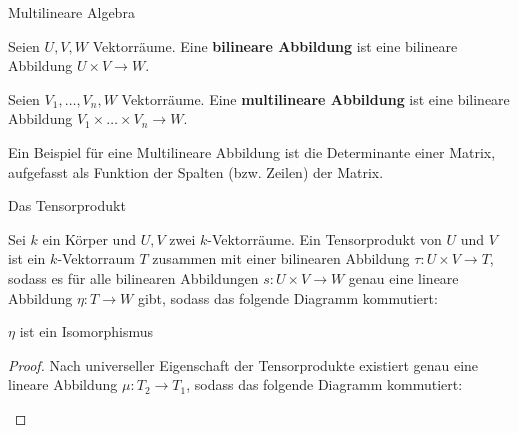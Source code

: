 \documentclass{report}
\newcommand{\tbf}[1]{\textbf{#1}}
\begin{document}
\begin{chapter}{Multilineare Algebra}
\begin{definition}
 Seien $U, V, W$ Vektorräume. Eine \tbf{bilineare Abbildung} ist eine bilineare Abbildung $U \times V \to W$.
\end{definition}
\begin{definition}
 Seien $V_1, \hdots, V_n, W$ Vektorräume. Eine \tbf{multilineare Abbildung} ist eine bilineare Abbildung $V_1 \times \hdots \times V_n \to W$.
\end{definition}
\noindent Ein Beispiel für eine Multilineare Abbildung ist die Determinante einer Matrix, aufgefasst als Funktion der Spalten (bzw. Zeilen) der Matrix.
\begin{section}{Das Tensorprodukt}
\begin{definition}
 Sei $k$ ein Körper und $U, V$ zwei $k$-Vektorräume. Ein Tensorprodukt von $U$ und $V$ ist ein $k$-Vektorraum $T$ zusammen mit einer bilinearen Abbildung $\tau : U \times V \to T$, sodass es für alle bilinearen Abbildungen $s : U \times V \to W$ genau eine lineare Abbildung $\eta : T \to W$ gibt, sodass das folgende Diagramm kommutiert:
 \begin{figure}[h!]
    \centering
 \end{figure}
\end{definition}
\begin{theorem}
 $\eta$ ist ein Isomorphismus
\end{theorem}
\begin{proof}
 Nach universeller Eigenschaft der Tensorprodukte existiert genau eine lineare Abbildung $\mu : T_2 \to T_1$, sodass das folgende Diagramm kommutiert:
 \begin{figure}[h!]
    \centering
 \end{figure}

\end{proof}
\end{section}
\end{chapter}
\end{document}
